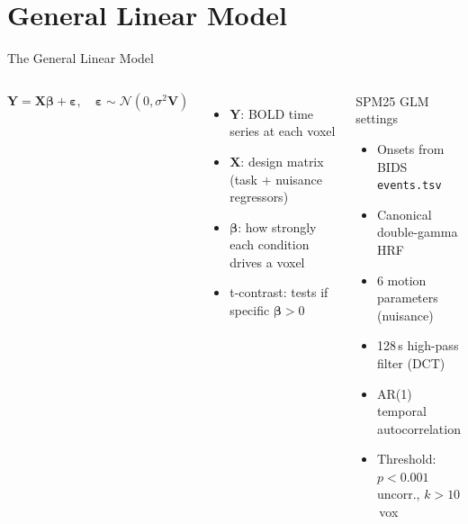 \documentclass[aspectratio=169]{beamer}
\begin{document}
\section{General Linear Model}

\begin{frame}{The General Linear Model}
  \begin{columns}
      \[
        \mathbf{Y} = \mathbf{X}\boldsymbol{\beta} +
        \boldsymbol{\varepsilon}, \quad
        \boldsymbol{\varepsilon} \sim \mathcal{N}(0, \sigma^2\mathbf{V})
      \]
      \begin{itemize}
        \item $\mathbf{Y}$: BOLD time series at each voxel
        \item $\mathbf{X}$: design matrix (task + nuisance regressors)
        \item $\boldsymbol{\beta}$: how strongly each condition drives a voxel
        \item t-contrast: tests if specific $\boldsymbol{\beta} > 0$
      \end{itemize}
      \begin{block}{SPM25 GLM settings}
        \begin{itemize}
          \item Onsets from BIDS \texttt{events.tsv}
          \item Canonical double-gamma HRF
          \item 6 motion parameters (nuisance)
          \item 128\,s high-pass filter (DCT)
          \item AR(1) temporal autocorrelation
          \item Threshold: $p<0.001$ uncorr., $k>10$\,vox
        \end{itemize}
      \end{block}
  \end{columns}
\end{frame}
\end{document}
